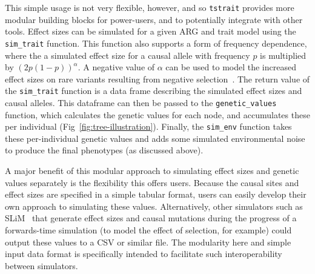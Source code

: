 \documentclass[unnumsec,webpdf,modern,large,namedate]{oup-authoring-template}%
\begin{document}
This simple usage is not very flexible, however,
and so \texttt{tstrait} provides more modular building blocks
for power-users, and to potentially integrate with other tools.
Effect sizes can be simulated for a given ARG and trait model
using the \texttt{sim\_trait} function.
This function also supports a form
of frequency dependence, where the a simulated effect size
for a causal allele with frequency $p$
is multiplied by $\left(2p(1-p)\right)^\alpha$.
A negative value of $\alpha$
can be used to model the increased effect sizes on rare variants
resulting from negative selection~\citep{speed2017}.
The return value of the \texttt{sim\_trait} function is a
data frame describing the simulated effect sizes and causal alleles.
This dataframe can then be passed to the \texttt{genetic\_values}
function, which calculates the genetic values for each
node, and accumulates these per individual
(Fig~\ref{fig:tree-illustration}). Finally, the \texttt{sim\_env}
function takes these per-individual genetic values
and adds some simulated environmental noise to produce the final
phenotypes (as discussed above).

A major benefit of this modular approach to simulating effect sizes
and genetic values separately is the flexibility this offers
users. Because the causal sites and effect sizes are specified in a
simple tabular format, users can easily develop their own approach
to simulating these values. Alternatively, other simulators
such as SLiM~\citep{haller2023} that generate effect sizes and
causal mutations during the progress of a forwards-time simulation
(to model the effect of selection, for example) could output these
values to a CSV or similar file. The modularity here and simple
input data format is specifically intended to facilitate such
interoperability between simulators.

\end{document}
